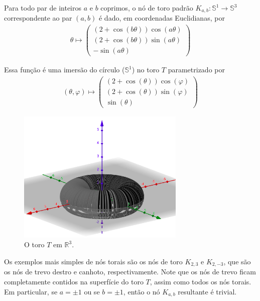 	\begin{deff}
		\label{def no de toro}
		Para todo par de inteiros $a$ e $b$ coprimos, o nó de toro padrão $K_{a,b}: \mathbb{S}^1\to\mathbb{S}^3$ correspondente ao par $(a,b)$ é dado, em coordenadas Euclidianas, por 
		\begin{align*}
		\theta\mapsto
		\left( 
		\begin{matrix}
		(2+\cos(b\theta))\cos(a\theta) \\
		(2+\cos(b\theta))\sin(a\theta) \\
		-\sin(a\theta)
		\end{matrix} 
		\right)
		\end{align*}	
	\end{deff}
	\par\vspace{0.3cm} Essa função é uma imersão do círculo ($\mathbb{S}^1$) no toro $T$ parametrizado por
	\begin{align*}
	(\theta, \varphi)\mapsto 
	\left( \begin{matrix}
	(2+\cos(\theta))\cos(\varphi) \\
	(2+\cos(\theta))\sin(\varphi) \\
	\sin(\theta)
	\end{matrix}  \right)
	\end{align*}
	\begin{figure}[H]
		\begin{center}
			\includegraphics[width=8cm]{Images/toro.png}
		\end{center}\caption{O toro $T$ em $\mathbb{R}^3$.}\label{toro}
	\end{figure}
	\par\vspace{0.3cm} Os exemplos mais simples de nós torais são os nós de toro $K_{2,3}$ e $K_{2,-3}$, que são os nós de trevo destro e canhoto, respectivamente. Note que os nós de trevo ficam completamente contidos na superfície do toro $T$, assim como todos os nós torais. Em particular, se $a = \pm1$ ou se $b = \pm1$, então o nó $K_{a,b}$ resultante é trivial.
	
